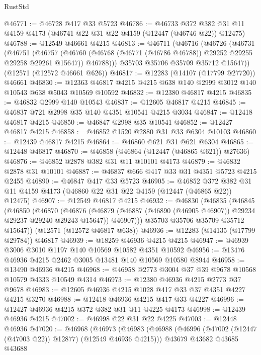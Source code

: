 \begin{lexlean}{RustStd}
\begin{coremodule}
@46771 := @46728 @417 @33 @5723
@46786 := @46733
    @372
    @382
    @31
    @11
    @4159
    @4173
    (@46741 @22 @31 @22 @4159 (@12447 (@46746 @22)) @12475)
@46788 := @12549 @46661 @4215
@46813 := @46711
    (@46716
      (@46726
        (@46731
          (@46751
            (@46757
              (@46760 (@46768 (@46771 (@46786 @46788)) @29252 @29255 @29258 @29261 @15647))
              @46788)))
        @35703
        @35706
        @35709
        @35712
        @15647))
    (@12571 (@12572 @46661 @626))
@46817 := @12283 (@14107 (@17799 @27720)) @46661
@46830 := @12363 @46817 @4215 @4215 @638 @140 @2999 @3012 @140 @10543 @638 @5043 @10569 @10592
@46832 := @12380 @46817 @4215
@46835 := @46832 @2999 @140 @10543
@46837 := @12605 @46817 @4215
@46845 := @46837 @721 @2998 @35 @140 @4351 @10541 @4215 @3034
@46847 := @12418 @46817 @4215
@46850 := @46847 @2998 @35 @10541
@46852 := @12427 @46817 @4215
@46858 := @46852 @1520 @2880 @31 @33 @6304 @10103
@46860 := @12439 @46817 @4215
@46864 := @46860 @621 @31 @621 @6304
@46865 := @12448 @46817
@46870 := @46858 (@46864 (@12447 (@46865 @621)) @27636)
@46876 := @46852 @2878 @382 @31 @11 @10101 @4173
@46879 := @46832 @2878 @31 @10101
@46887 := @46837 @666 @417 @33 @31 @4351 @5723 @4215 @2455
@46890 := @46847 @417 @33 @5723
@46905 := @46852
    @372
    @382
    @31
    @11
    @4159
    @4173
    (@46860 @22 @31 @22 @4159 (@12447 (@46865 @22)) @12475)
@46907 := @12549 @46817 @4215
@46932 := @46830
    (@46835
      (@46845
        (@46850
          (@46870
            (@46876
              (@46879 (@46887 (@46890 (@46905 @46907)) @29234 @29237 @29240 @29243 @15647))
              @46907)))
        @35703
        @35706
        @35709
        @35712
        @15647))
    (@12571 (@12572 @46817 @638))
@46936 := @12283 (@14135 (@17799 @29784)) @46817
@46939 := @18259 @46936 @4215 @4215
@46947 := @46939 @3006 @3010 @1197 @140 @10569 @10582 @4351 @10592
@46956 := @13476 @46936 @4215 @2462 @3005 @13481 @140 @10569 @10580 @8944
@46958 := @13490 @46936 @4215
@46968 := @46958 @2773 @3004 @37 @39 @9678 @10568 @10579 @4333 @10549 @4314
@46973 := @12380 @46936 @4215 @2773 @37 @9678
@46983 := @12605 @46936 @4215 @1028 @417 @33 @37 @4351 @4227 @4215 @3270
@46988 := @12418 @46936 @4215 @417 @33 @4227
@46996 := @12427 @46936 @4215 @372 @382 @31 @11 @4225 @4173
@46998 := @12439 @46936 @4215
@47002 := @46998 @22 @31 @22 @4225
@47003 := @12448 @46936
@47020 := @46968
    (@46973
      (@46983
        (@46988 (@46996 (@47002 (@12447 (@47003 @22)) @12877) (@12549 @46936 @4215)))
        @43679
        @43682
        @43685
        @43688

\end{coremodule}
\end{lexlean}
